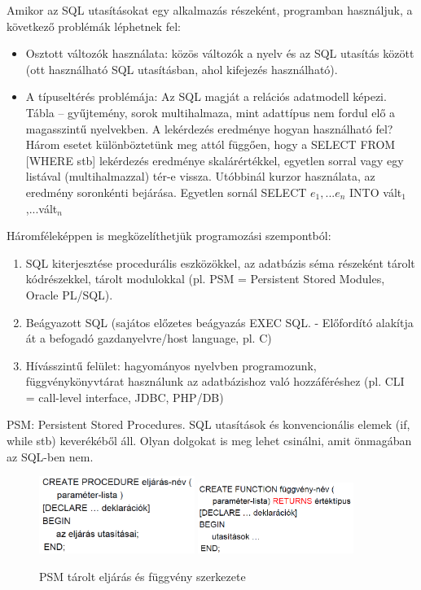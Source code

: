 \documentclass[margin=0px]{article}
\begin{document}
	Amikor az SQL utasításokat egy alkalmazás részeként, programban használjuk, a következő problémák léphetnek fel:
	\begin{itemize}
		\item Osztott változók használata: közös változók a nyelv és az SQL utasítás között (ott használható SQL utasításban, ahol kifejezés használható).
		\item A típuseltérés problémája: Az SQL magját a relációs adatmodell képezi. Tábla – gyűjtemény, sorok multihalmaza, mint adattípus nem fordul elő a magasszintű nyelvekben. A lekérdezés eredménye hogyan használható fel? Három esetet különböztetünk meg attól függően, hogy a SELECT FROM [WHERE stb] lekérdezés eredménye skalárértékkel, egyetlen sorral vagy egy listával (multihalmazzal) tér-e vissza. Utóbbinál kurzor használata, az eredmény soronkénti bejárása. Egyetlen sornál SELECT $e_1,...e_n$ INTO vált$_1$,...vált$_n$
 	\end{itemize}
 	Háromféleképpen is megközelíthetjük programozási szempontból:
 	\begin{enumerate}
 		\item SQL kiterjesztése procedurális eszközökkel, az adatbázis séma részeként tárolt kódrészekkel, tárolt modulokkal (pl. PSM = Persistent Stored Modules, Oracle PL/SQL).
 		\item Beágyazott SQL (sajátos előzetes beágyazás EXEC SQL. - Előfordító alakítja át a befogadó gazdanyelvre/host language, pl. C)
 		\item Hívásszintű felület: hagyományos nyelvben programozunk, függvénykönyvtárat használunk az adatbázishoz való hozzáféréshez (pl. CLI = call-level interface, JDBC, PHP/DB)
 	\end{enumerate}
 	PSM: Persistent Stored Procedures. SQL utasítások és konvencionális elemek (if, while stb) keverékéből áll. Olyan dolgokat is meg lehet csinálni, amit önmagában az SQL-ben nem.
 	\begin{figure}[H]
 		\centering
 		\includegraphics[width=0.45\textwidth]{img/psm1.png}
 		\includegraphics[width=0.45\textwidth]{img/psm2.png}
 		\caption{PSM tárolt eljárás és függvény szerkezete}
 	\end{figure}
\end{document}
